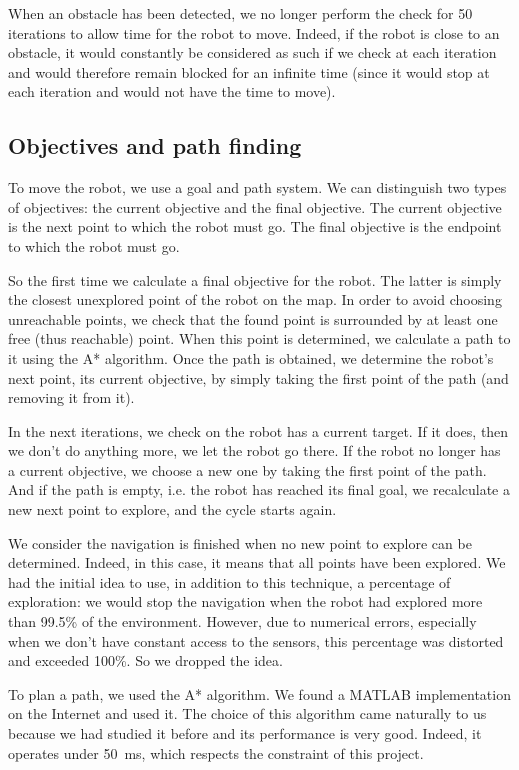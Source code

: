 \documentclass[a4paper, 10pt, conference]{ieeeconf}
\begin{document}
    When an obstacle has been detected, we no longer perform the check for \num{50} iterations to allow time for the robot to move. Indeed, if the robot is close to an obstacle, it would constantly be considered as such if we check at each iteration and would therefore remain blocked for an infinite time (since it would stop at each iteration and would not have the time to move).
    
    \subsection{Objectives and path finding}
    
    To move the robot, we use a goal and path system. We can distinguish two types of objectives: the current objective and the final objective. The current objective is the next point to which the robot must go. The final objective is the endpoint to which the robot must go.
    
    So the first time we calculate a final objective for the robot. The latter is simply the closest unexplored point of the robot on the map. In order to avoid choosing unreachable points, we check that the found point is surrounded by at least one free (thus reachable) point. When this point is determined, we calculate a path to it using the A* algorithm. Once the path is obtained, we determine the robot's next point, its current objective, by simply taking the first point of the path (and removing it from it).
    
    In the next iterations, we check on the robot has a current target. If it does, then we don't do anything more, we let the robot go there. If the robot no longer has a current objective, we choose a new one by taking the first point of the path. And if the path is empty, i.e. the robot has reached its final goal, we recalculate a new next point to explore, and the cycle starts again.
    
    We consider the navigation is finished when no new point to explore can be determined. Indeed, in this case, it means that all points have been explored. We had the initial idea to use, in addition to this technique, a percentage of exploration: we would stop the navigation when the robot had explored more than 99.5\% of the environment. However, due to numerical errors, especially when we don't have constant access to the sensors, this percentage was distorted and exceeded 100\%. So we dropped the idea.
    
    To plan a path, we used the A* algorithm. We found a MATLAB implementation on the Internet and used it. The choice of this algorithm came naturally to us because we had studied it before and its performance is very good. Indeed, it operates under \SI{50}{\milli\second}, which respects the constraint of this project.
    
\end{document}
